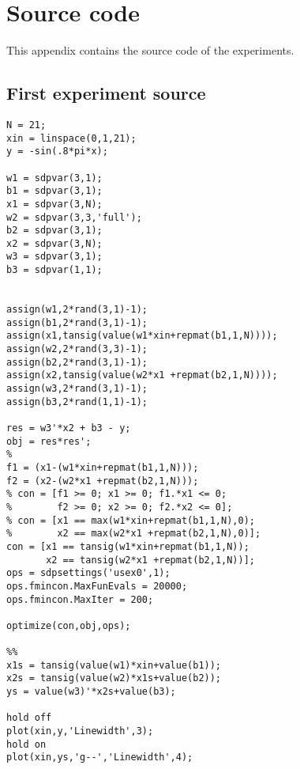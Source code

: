 \chapter{Source code}
\label{app:A}
This appendix contains the source code of the experiments.

\section{First experiment source}
\begin{verbatim}
N = 21;
xin = linspace(0,1,21);
y = -sin(.8*pi*x);

w1 = sdpvar(3,1);
b1 = sdpvar(3,1);
x1 = sdpvar(3,N);
w2 = sdpvar(3,3,'full');
b2 = sdpvar(3,1);
x2 = sdpvar(3,N);
w3 = sdpvar(3,1);
b3 = sdpvar(1,1);


assign(w1,2*rand(3,1)-1);
assign(b1,2*rand(3,1)-1);
assign(x1,tansig(value(w1*xin+repmat(b1,1,N))));
assign(w2,2*rand(3,3)-1);
assign(b2,2*rand(3,1)-1);
assign(x2,tansig(value(w2*x1 +repmat(b2,1,N))));
assign(w3,2*rand(3,1)-1);
assign(b3,2*rand(1,1)-1);

res = w3'*x2 + b3 - y;
obj = res*res';
% 
f1 = (x1-(w1*xin+repmat(b1,1,N)));
f2 = (x2-(w2*x1 +repmat(b2,1,N)));
% con = [f1 >= 0; x1 >= 0; f1.*x1 <= 0;
%        f2 >= 0; x2 >= 0; f2.*x2 <= 0];
% con = [x1 == max(w1*xin+repmat(b1,1,N),0);
%        x2 == max(w2*x1 +repmat(b2,1,N),0)];
con = [x1 == tansig(w1*xin+repmat(b1,1,N));
       x2 == tansig(w2*x1 +repmat(b2,1,N))];
ops = sdpsettings('usex0',1);
ops.fmincon.MaxFunEvals = 20000;
ops.fmincon.MaxIter = 200;

optimize(con,obj,ops);

%%
x1s = tansig(value(w1)*xin+value(b1));
x2s = tansig(value(w2)*x1s+value(b2));
ys = value(w3)'*x2s+value(b3);

hold off
plot(xin,y,'Linewidth',3);
hold on
plot(xin,ys,'g--','Linewidth',4);
\end{verbatim}

